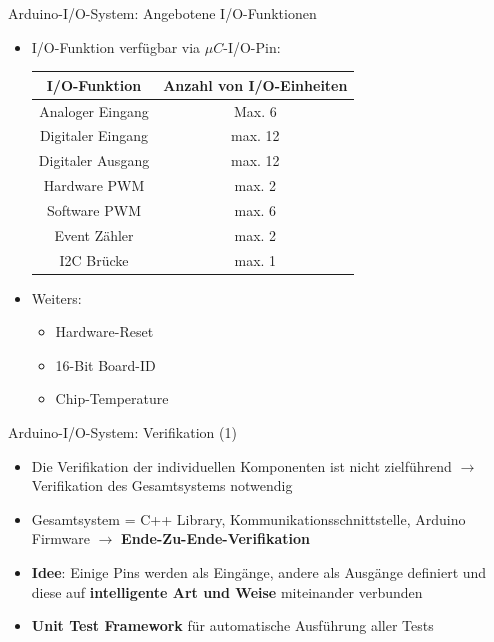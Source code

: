 \documentclass{beamer}
\begin{document}
\begin{frame}{Arduino-I/O-System: Angebotene I/O-Funktionen}
	\begin{itemize}
		\item I/O-Funktion verf\"ugbar via $\mu{}C$-I/O-Pin:
		\begin{table}[htbp]
			\begin{tabular}{|c|c|}
				\hline 
				\textbf{I/O-Funktion} & \textbf{Anzahl von I/O-Einheiten} \\ 
				\hline \hline 
				Analoger Eingang & Max. 6 \\ 
				\hline 
				Digitaler Eingang & max. 12  \\ 
				\hline
				Digitaler Ausgang & max. 12 \\ 
				\hline
				Hardware PWM & max. 2 \\ 
				\hline
				Software PWM & max. 6 \\ 
				\hline
				Event Z\"ahler & max. 2 \\
				\hline
				I2C Br\"ucke & max. 1 \\
				\hline
			\end{tabular}
		\end{table}
		\item Weiters:
		\begin{itemize}
			\item Hardware-Reset
			\item 16-Bit Board-ID
			\item Chip-Temperature
		\end{itemize}
	\end{itemize}
\end{frame}
\begin{frame}{Arduino-I/O-System: Verifikation (1)}
	\begin{itemize}
		\item Die Verifikation der individuellen Komponenten ist nicht zielf\"uhrend $\rightarrow$ Verifikation des Gesamtsystems notwendig
	\end{itemize}
	\begin{itemize}
		\item Gesamtsystem = C++ Library, Kommunikationsschnittstelle, Arduino Firmware $\rightarrow$ \textbf{Ende-Zu-Ende-Verifikation}
	\end{itemize}
	\begin{itemize}
		\item \textbf{Idee}: Einige Pins werden als Eing\"ange, andere als Ausg\"ange definiert und diese auf \textbf{intelligente Art und Weise} miteinander verbunden
	\end{itemize}
	\begin{itemize}
		\item \textbf{Unit Test Framework} f\"ur automatische Ausf\"uhrung aller Tests
	\end{itemize}
\end{frame}
\end{document}
